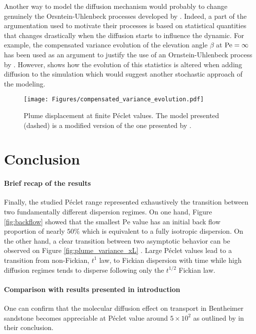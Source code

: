 Another way to model the diffusion mechanism would probably to change genuinely the Orsntein-Uhlenbeck processes developed by \citet{Meyer2016}. 
Indeed, a part of the argumentation used to motivate their processes is based on statistical quantities that changes drastically when the diffusion starts to influence the dynamic.
For example, the compensated variance evolution of the elevation angle $\beta$ at $\mathrm{Pe} = \infty$ has been used as an argument to justify the use of an Ornstein-Uhlenbeck process by \citet{Meyer2016}.
However,  shows how the evolution of this statistics is altered when adding diffusion to the simulation which would suggest another stochastic approach of the modeling.
\begin{figure}[h!]
	\centering
	\texttt{[image: Figures/compensated\_variance\_evolution.pdf]}
	\caption{Plume displacement at finite Péclet values. The model presented (dashed) is a modified version of the one presented by \citet{Meyer2016}.}
	\label{fig:compensated_variance_evolution}
\end{figure}

\chapter{Conclusion}

\subsubsection{Brief recap of the results}
Finally, the studied Péclet range represented exhaustively the transition between two fundamentally different dispersion regimes.
On one hand, Figure \ref{fig:backflow} showed that the smallest $\mathrm{Pe}$ value has an initial back flow proportion of nearly $50\%$ which is equivalent to a fully isotropic dispersion. 
On the other hand, a clear transition between two asymptotic behavior can be observed on Figure \ref{fig:plume_variance_xL} . Large Péclet values lead to a transition from non-Fickian, $t^1$ law, to Fickian dispersion with time while high diffusion regimes tends to disperse following only the $t^{1/2}$ Fickian law.

\subsubsection{Comparison with results presented in introduction}

One can confirm that the molecular diffusion effect on transport in Bentheimer sandstone becomes appreciable at Péclet value around $5\times 10^2$ as outlined by \citet{Meyer2016} in their conclusion.

